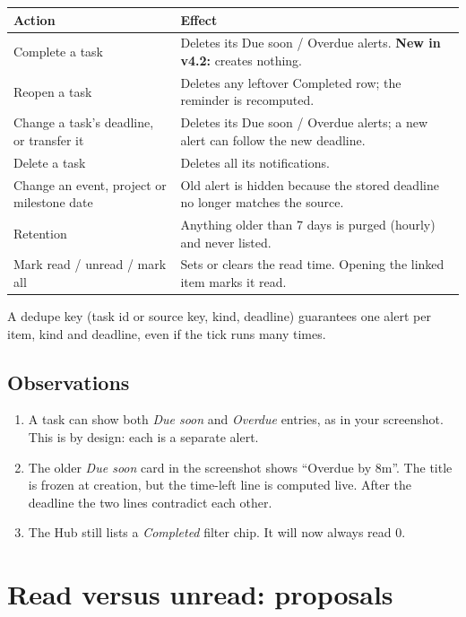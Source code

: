 ﻿\documentclass[10.5pt,a4paper]{article}
\begin{document}
\begin{tabular}{@{}p{5.2cm}p{10.9cm}@{}}
\toprule
\textbf{Action} & \textbf{Effect} \\
\midrule
Complete a task & Deletes its Due soon / Overdue alerts. \textbf{New in v4.2:} creates nothing. \\
Reopen a task & Deletes any leftover Completed row; the reminder is recomputed. \\
Change a task's deadline, or transfer it & Deletes its Due soon / Overdue alerts; a new alert can follow the new deadline. \\
Delete a task & Deletes all its notifications. \\
Change an event, project or milestone date & Old alert is hidden because the stored deadline no longer matches the source. \\
Retention & Anything older than 7 days is purged (hourly) and never listed. \\
Mark read / unread / mark all & Sets or clears the read time. Opening the linked item marks it read. \\
\bottomrule
\end{tabular}

A dedupe key (task id or source key, kind, deadline) guarantees one alert per item, kind and deadline, even if the tick runs many times.

\subsection{Observations}

\begin{enumerate}
  \item A task can show both \emph{Due soon} and \emph{Overdue} entries, as in your screenshot. This is by design: each is a separate alert.
  \item The older \emph{Due soon} card in the screenshot shows ``Overdue by 8m''. The title is frozen at creation, but the time-left line is computed live. After the deadline the two lines contradict each other.
  \item The Hub still lists a \emph{Completed} filter chip. It will now always read 0.
\end{enumerate}

\newpage
\section{Read versus unread: proposals}\label{sec:proposals}
\end{document}
